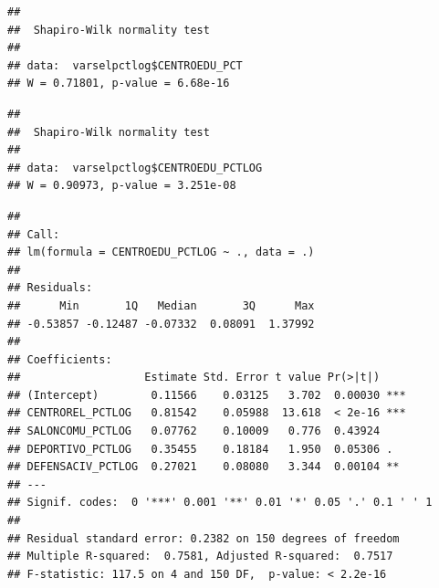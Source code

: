 \documentclass[11pt,]{article}
\newenvironment{Shaded}{\begin{snugshade}}{\end{snugshade}}
\newcommand{\KeywordTok}[1]{\textcolor[rgb]{0.13,0.29,0.53}{\textbf{#1}}}
\newcommand{\StringTok}[1]{\textcolor[rgb]{0.31,0.60,0.02}{#1}}
\newcommand{\OperatorTok}[1]{\textcolor[rgb]{0.81,0.36,0.00}{\textbf{#1}}}
\newcommand{\NormalTok}[1]{#1}
\begin{document}
\begin{verbatim}
## 
##  Shapiro-Wilk normality test
## 
## data:  varselpctlog$CENTROEDU_PCT
## W = 0.71801, p-value = 6.68e-16
\end{verbatim}

\begin{Shaded}
\end{Shaded}

\begin{verbatim}
## 
##  Shapiro-Wilk normality test
## 
## data:  varselpctlog$CENTROEDU_PCTLOG
## W = 0.90973, p-value = 3.251e-08
\end{verbatim}

\begin{Shaded}
\end{Shaded}

\begin{verbatim}
## 
## Call:
## lm(formula = CENTROEDU_PCTLOG ~ ., data = .)
## 
## Residuals:
##      Min       1Q   Median       3Q      Max 
## -0.53857 -0.12487 -0.07332  0.08091  1.37992 
## 
## Coefficients:
##                   Estimate Std. Error t value Pr(>|t|)    
## (Intercept)        0.11566    0.03125   3.702  0.00030 ***
## CENTROREL_PCTLOG   0.81542    0.05988  13.618  < 2e-16 ***
## SALONCOMU_PCTLOG   0.07762    0.10009   0.776  0.43924    
## DEPORTIVO_PCTLOG   0.35455    0.18184   1.950  0.05306 .  
## DEFENSACIV_PCTLOG  0.27021    0.08080   3.344  0.00104 ** 
## ---
## Signif. codes:  0 '***' 0.001 '**' 0.01 '*' 0.05 '.' 0.1 ' ' 1
## 
## Residual standard error: 0.2382 on 150 degrees of freedom
## Multiple R-squared:  0.7581, Adjusted R-squared:  0.7517 
## F-statistic: 117.5 on 4 and 150 DF,  p-value: < 2.2e-16
\end{verbatim}
\end{document}
